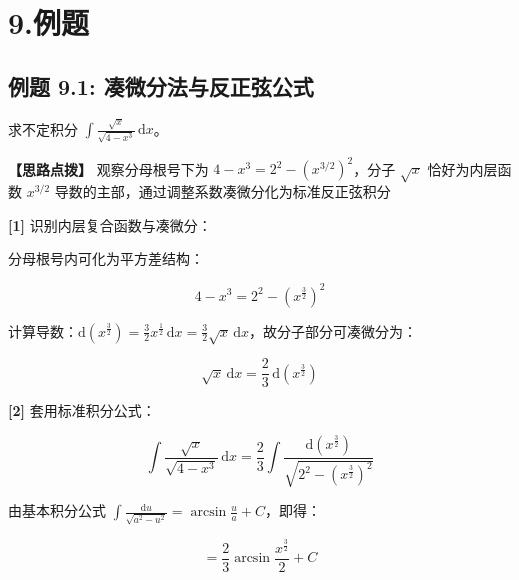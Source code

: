 \documentclass[11pt,a4paper,UTF8]{ctexart}
\begin{document}
\pagestyle{fancy}
\fancyhf{}
\fancyhead[R]{\small\color{TitlePurple}\nouppercase{\leftmark}}
\renewcommand{\headrulewidth}{0.5pt}

\tableofcontents
\newpage
{}


\section{9.例题}


\subsection{例题 9.1: 凑微分法与反正弦公式}

求不定积分 $\int \frac{\sqrt{x}}{\sqrt{4-x^3}}\,\mathrm{d}x$。

\textbf{\color{DeepPurple}【思路点拨】} 观察分母根号下为 $4 - x^3 = 2^2 - (x^{3/2})^2$，分子 $\sqrt{x}$ 恰好为内层函数 $x^{3/2}$ 导数的主部，通过调整系数凑微分化为标准反正弦积分


\begin{solbox}[分步推导与答题规范]
\textbf{[1]} 识别内层复合函数与凑微分：

分母根号内可化为平方差结构：


\begin{equation*}
4 - x^3 = 2^2 - \left(x^{\frac{3}{2}}\right)^2
\end{equation*}


计算导数：$\mathrm{d}\left(x^{\frac{3}{2}}\right) = \frac{3}{2}x^{\frac{1}{2}}\,\mathrm{d}x = \frac{3}{2}\sqrt{x}\,\mathrm{d}x$，故分子部分可凑微分为：


\begin{equation*}
\sqrt{x}\,\mathrm{d}x = \frac{2}{3}\,\mathrm{d}\left(x^{\frac{3}{2}}\right)
\end{equation*}


\textbf{[2]} 套用标准积分公式：


\begin{equation*}
\int \frac{\sqrt{x}}{\sqrt{4-x^3}}\,\mathrm{d}x = \frac{2}{3}\int \frac{\mathrm{d}\left(x^{\frac{3}{2}}\right)}{\sqrt{2^2 - \left(x^{\frac{3}{2}}\right)^2}}
\end{equation*}


由基本积分公式 $\int \frac{\mathrm{d}u}{\sqrt{a^2-u^2}} = \arcsin\frac{u}{a} + C$，即得：


\begin{equation*}
= \frac{2}{3}\arcsin\frac{x^{\frac{3}{2}}}{2} + C
\end{equation*}

\end{solbox}
\end{document}
